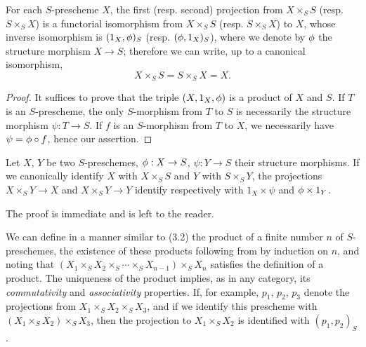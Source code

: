 \begin{prop}[3.3.3]
\label{1.3.3.3}
For each $S$-prescheme $X$, the first (resp. second) projection from
$X\times_S S$ (resp. $S\times_S X$) is a functorial isomorphism from
$X\times_S S$ (resp. $S\times_S X$) to $X$, whose inverse isomorphism is
$(1_X,\phi)_S$ (resp. $(\phi,1_X)_S$), where we denote by $\phi$ the
structure morphism $X\to S$; therefore we can write, up to a canonical
isomorphism,
\[
  X\times_S S=S\times_S X=X.
\]
\end{prop}

\begin{proof}
\label{proof-1.3.3.3}
It suffices to prove that the triple $(X,1_X,\phi)$ is a product of $X$ and
$S$. If $T$ is an $S$-prescheme, the only $S$-morphism from $T$ to $S$ is
necessarily the structure morphism $\psi:T\to S$. If $f$ is an $S$-morphism from
$T$ to $X$, we necessarily have $\psi=\phi\circ f$, hence our assertion.
\end{proof}

\begin{cor}[3.3.4]
\label{1.3.3.4}
Let $X$, $Y$ be two $S$-preschemes, $\vphi:X\to S$, $\psi:Y\to S$ their
structure morphisms. If we canonically identify $X$ with $X\times_S S$ and $Y$
with $S\times_S Y$, the projections $X\times_S Y\to X$ and $X\times_S Y\to Y$
identify respectively with $1_X\times\psi$ and $\phi\times 1_Y$.
\end{cor}

The proof is immediate and is left to the reader.

\begin{env}[3.3.5]
\label{1.3.3.5}
We can define in a manner similar to (3.2) the product of a
finite number $n$ of $S$-preschemes, the existence of these products following
from  by induction on $n$, and noting that
$(X_1\times_S X_2\times_S\cdots\times_S X_{n-1})\times_S X_n$ satisfies the
definition of a product. The uniqueness of the product implies, as in any
category, its \emph{commutativity} and \emph{associativity} properties. If, for
example, $p_1$, $p_2$, $p_3$ denote the projections from
$X_1\times_S X_2\times_S X_3$, and if we identify this prescheme with
$(X_1\times_S X_2)\times_S X_3$, then the projection to $X_1\times_S X_2$ is
identified with $(p_1,p_2)_S$.
\end{env}

